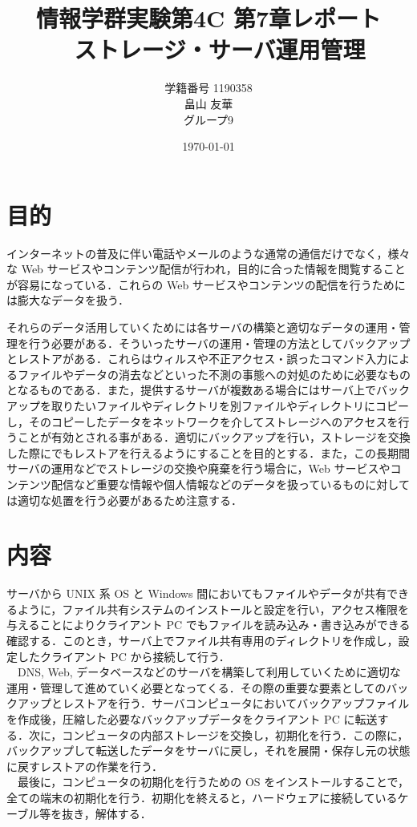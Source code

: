 \documentclass[a4j,titlepage]{jarticle}
\title{情報学群実験第4C 第7章レポート\\　ストレージ・サーバ運用管理}
\author{学籍番号 1190358\\
        畠山 友華\\
        グループ9}
\date{\today}
\begin{document}
\maketitle
\section{目的}
インターネットの普及に伴い電話やメールのような通常の通信だけでなく，様々な Web サービスやコンテンツ配信が行われ，目的に合った情報を閲覧することが容易になっている．これらの Web サービスやコンテンツの配信を行うためには膨大なデータを扱う．

それらのデータ活用していくためには各サーバの構築と適切なデータの運用・管理を行う必要がある．そういったサーバの運用・管理の方法としてバックアップとレストアがある．これらはウィルスや不正アクセス・誤ったコマンド入力によるファイルやデータの消去などといった不測の事態への対処のために必要なものとなるものである．また，提供するサーバが複数ある場合にはサーバ上でバックアップを取りたいファイルやディレクトリを別ファイルやディレクトリにコピーし，そのコピーしたデータをネットワークを介してストレージへのアクセスを行うことが有効とされる事がある．適切にバックアップを行い，ストレージを交換した際にでもレストアを行えるようにすることを目的とする．また，この長期間サーバの運用などでストレージの交換や廃棄を行う場合に，Web サービスやコンテンツ配信など重要な情報や個人情報などのデータを扱っているものに対しては適切な処置を行う必要があるため注意する．

\section{内容}
サーバから UNIX 系 OS と Windows 間においてもファイルやデータが共有できるように，ファイル共有システムのインストールと設定を行い，アクセス権限を与えることによりクライアント PC でもファイルを読み込み・書き込みができる確認する．このとき，サーバ上でファイル共有専用のディレクトリを作成し，設定したクライアント PC から接続して行う．\\ 
　DNS, Web, データベースなどのサーバを構築して利用していくために適切な運用・管理して進めていく必要となってくる．その際の重要な要素としてのバックアップとレストアを行う．サーバコンピュータにおいてバックアップファイルを作成後，圧縮した必要なバックアップデータをクライアント PC に転送する．次に，コンピュータの内部ストレージを交換し，初期化を行う．この際に，バックアップして転送したデータをサーバに戻し，それを展開・保存し元の状態に戻すレストアの作業を行う．\\
　最後に，コンピュータの初期化を行うための OS をインストールすることで，全ての端末の初期化を行う．初期化を終えると，ハードウェアに接続しているケーブル等を抜き，解体する．
\end{document}
